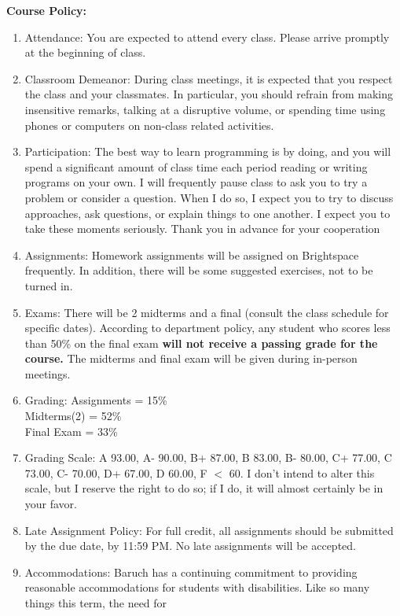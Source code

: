 \documentclass[a4paper]{article}
\begin{document}
\newpage
\textbf{Course Policy:}
\begin{enumerate}
    \item Attendance: You are expected to attend every class. Please arrive promptly at the beginning of
    class.
    \item Classroom Demeanor: During class meetings, it is expected that you respect the class and your
    classmates. In particular, you should refrain from making insensitive remarks, talking at a
    disruptive volume, or spending time using phones or computers on non-class related activities.
    \item Participation: The best way to learn programming is by doing, and you will spend a significant
    amount of class time each period reading or writing programs on your own. I will frequently
    pause class to ask you to try a problem or consider a question. When I do so, I expect you to try
    to discuss approaches, ask questions, or explain things to one another. I expect you to take these
    moments seriously. Thank you in advance for your cooperation
    \item Assignments: Homework assignments will be assigned on Brightspace frequently. In addition,
    there will be some suggested exercises, not to be turned in.
    \item Exams: There will be 2 midterms and a final (consult the class schedule for specific dates).
    According to department policy, any student who scores less than 50\% on the final exam \textbf{will
    not receive a passing grade for the course.} The midterms and final exam will be given
    during in-person meetings.
    \item Grading:
    Assignments = 15\% \\
    Midterms(2) = 52\% \\ 
    Final Exam = 33\%
    \item Grading Scale: A 93.00, A- 90.00, B+ 87.00, B 83.00, B- 80.00, C+ 77.00, C 73.00, C- 70.00, D+
    67.00, D 60.00, F $<$ 60. I don't intend to alter this scale, but I reserve the right to do so; if I do,
    it will almost certainly be in your favor.
    \item Late Assignment Policy: For full credit, all assignments should be submitted by the due date, by
    11:59 PM. No late assignments will be accepted.
    \item Accommodations: Baruch has a continuing commitment to providing reasonable
    accommodations for students with disabilities. Like so many things this term, the need for

\end{enumerate}
\end{document}
